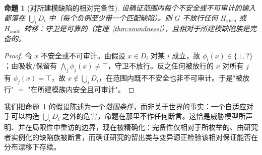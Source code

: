 \documentclass[11pt]{ctexart}
\newtheorem{proposition}{命题}
\begin{document}
\begin{table}[t]
\centering
\footnotesize
\caption{定义~\ref{def:defects} 的属性匹配缺陷族，按每个缺陷所依赖的事实组织。末列陈述为何一个概率性、仅依赖证据的裁判在原则上无法闭合此案——把必要性结果（定理~\ref{thm:necessity}）与分离结果（定理~\ref{thm:separation}）相连。}
\label{tab:defects}
\end{table}

\begin{proposition}[对所建模缺陷的相对完备性]
\label{prop:completeness}
设确证范围内每个不安全或不可审计的输入都落在 $\bigcup_{i}D_i$ 中（每个负例至少带一个匹配缺陷）。则 $G$ 不放行任何 $H_{\mathrm{auth}}$ 或 $H_{\mathrm{audit}}$ 转移：守卫是可靠的（定理~\ref{thm:soundness}），且相对于所建模缺陷族是完备的。
\end{proposition}
\begin{proof}
令 $x$ 不安全或不可审计。由假设 $x\in D_i$ 对某 $i$ 成立，故 $\phi_i(x)\in\{\bot,?\}$；由吸收/保留有 $\bigwedge_j\phi_j(x)\neq\top$，守卫不放行。反之任何被放行的 $x$ 对所有 $j$ 有 $\phi_j(x)=\top$，故 $x\notin\bigcup_iD_i$，在范围内既不不安全也非不可审计。于是"被放行" $=$ "在所建模族内安全且可审计"。
\end{proof}

我们把命题~\ref{prop:completeness} 的假设陈述为一个\emph{范围条件}，而非关于世界的事实：一个自适应对手可以构造 $\bigcup_iD_i$ 之外的危害，命题在那里不作任何断言。这恰是威胁模型所声明、并在局限性中重访的边界，现在被精确化：完备性仅相对于所枚举的、由研究者实例化的缺陷族被断言，而确证研究的留出类与变异源正检验该相对保证能否在分布漂移下存续。
\end{document}

